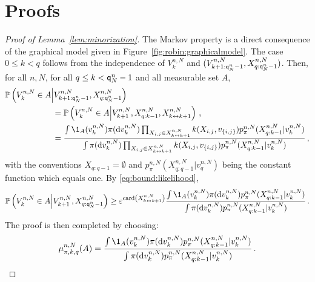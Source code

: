 \section{Proofs}
\label{sec:proofs}
\begin{proof}[Proof of Lemma~\ref{lem:minorization}]
The Markov property is a direct consequence of the graphical model given in Figure~\ref{fig:robin:graphicalmodel}. The case $0\le k <q$ follows from the independence of $V_k^{n,N}$ and $(V^{n,N}_{k+1:{\mathsf{q}}^{n}_{N}-1},X^{n,N}_{q:{\mathsf{q}}^{n}_{N}-1})$. Then, for all $n,N$, for all $q\le k < {\mathsf{q}}^{n}_{N}-1$ and all measurable set $A$,
\begin{align*}
\mathbb{P}\left(V^{n,N}_{k}\in A\middle|V^{n,N}_{k+1:\ordermax{n}{N}-1},X_{q:\ordermax{n}{N}-1}^{n,N}\right) &\\
 &\hspace{-3.2cm}= \mathbb{P}\left(V^{n,N}_{k}\in A\middle|V^{n,N}_{k+1},X^{n,N}_{q:k-1},X^{n,N}_{k\link k+1}\right)\eqsp,\\
 &\hspace{-3.2cm}= \frac{\int \1_{A}(v^{n,N}_{k})\pi(\rmd v^{n,N}_{k})\prod_{X_{i,j}\in X^{n,N}_{k\link k+1}}\condlik(X_{i,j},v_{\{i,j\}})p_{\pi}^{n,N}(X^{n,N}_{q:k-1}|v^{n,N}_{k})}{\int \pi(\rmd v^{n,N}_{k})\prod_{X_{i,j}\in X^{n,N}_{k\link k+1}}\condlik(X_{i,j},v_{\{i,j\}})p_{\pi}^{n,N}(X^{n,N}_{q:k-1}|v^{n,N}_{k})}\eqsp,
\end{align*}
with the conventions $X_{q:q-1} = \emptyset$ and $p_{\pi}^{n,N}(X^{n,N}_{q:q-1}|v^{n,N}_{q})$ being the constant function which equals one. By \eqref{eq:bound:likelihood},
\[
\mathbb{P}\left(V^{n,N}_{k}\in A\middle|V^{n,N}_{k+1},X_{q:\ordermax{n}{N}-1}^{n,N}\right)
\ge \varepsilon^{\card\left(X^{n,N}_{k\link k+1}\right)}\frac{\int \1_{A}(v^{n,N}_{k})\pi(\rmd v^{n,N}_{k})p_{\pi}^{n,N}(X^{n,N}_{q:k-1}|v^{n,N}_{k})}{\int \pi(\rmd v^{n,N}_{k})p_{\pi}^{n,N}(X^{n,N}_{q:k-1}|v^{n,N}_{k})}\eqsp. 
\]
The proof is then completed by choosing:
\[
\mu^{n,N}_{\pi,k,q}(A) = \frac{\int \1_{A}(v^{n,N}_{k})\pi(\rmd v^{n,N}_{k})p_{\pi}^{n,N}(X^{n,N}_{q:k-1}|v^{n,N}_{k})}{\int \pi(\rmd v^{n,N}_{k})p_{\pi}^{n,N}(X^{n,N}_{q:k-1}|v^{n,N}_{k})}\eqsp. 
\]
\end{proof}

